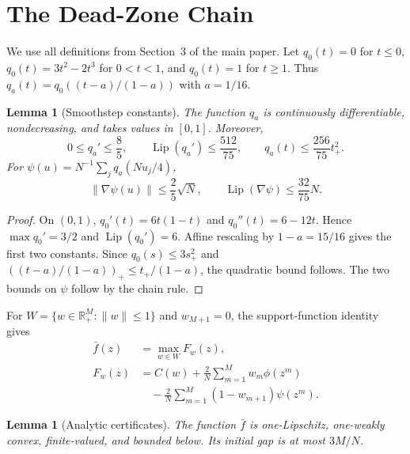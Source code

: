 \documentclass[twoside]{article}
\newtheorem{lemma}[theorem]{Lemma}
\newcommand{\R}{\mathbb R}
\begin{document}
\runningauthor{}


\appendix

\section{The Dead-Zone Chain}
\label{app:chain}

We use all definitions from Section~3 of the main paper. Let
$q_0(t)=0$ for $t\leq0$, $q_0(t)=3t^2-2t^3$ for $0<t<1$, and $q_0(t)=1$
for $t\geq1$. Thus $q_a(t)=q_0((t-a)/(1-a))$ with $a=1/16$.

\begin{lemma}[Smoothstep constants]
\label{lem:q}
The function $q_a$ is continuously differentiable, nondecreasing, and takes
values in $[0,1]$. Moreover,
\[
 0\leq q_a'\leq\frac85,\qquad
 \operatorname{Lip}(q_a')\leq\frac{512}{75},\qquad
 q_a(t)\leq\frac{256}{75}t_+^2.
\]
For $\psi(u)=N^{-1}\sum_jq_a(Nu_j/4)$,
\[
 \|\nabla\psi(u)\|\leq\frac25\sqrt N,
 \qquad \operatorname{Lip}(\nabla\psi)\leq\frac{32}{75}N.
\]
\end{lemma}

\begin{proof}
On $(0,1)$, $q_0'(t)=6t(1-t)$ and $q_0''(t)=6-12t$. Hence
$\max q_0'=3/2$ and $\operatorname{Lip}(q_0')=6$. Affine rescaling by
$1-a=15/16$ gives the first two constants. Since
$q_0(s)\leq3s_+^2$ and
$((t-a)/(1-a))_+\leq t_+/(1-a)$, the quadratic bound follows. The two
bounds on $\psi$ follow by the chain rule.
\end{proof}

For $W=\{w\in\R_+^M:\|w\|\leq1\}$ and $w_{M+1}=0$, the support-function
identity gives
\begin{align}
 \bar f(z)&=\max_{w\in W}F_w(z),\nonumber\\
 F_w(z)&=C(w)+\frac2N\sum_{m=1}^Mw_m\phi(z^m)\nonumber\\
 &\quad-\frac2N\sum_{m=1}^M(1-w_{m+1})\psi(z^m).
 \label{eq:variational}
\end{align}

\begin{lemma}[Analytic certificates]
\label{lem:analytic}
The function $\bar f$ is one-Lipschitz, one-weakly convex, finite-valued,
and bounded below. Its initial gap is at most $3M/N$.
\end{lemma}
\end{document}

